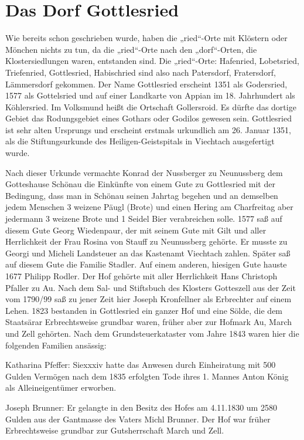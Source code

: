\documentclass[12pt,a4pager]{book}
\begin{document}
\section{Das Dorf Gottlesried}

Wie bereits schon geschrieben wurde, haben die „ried“-Orte mit Klöstern oder
Mönchen nichts zu tun, da die „ried“-Orte nach den „dorf“-Orten, die
Klostersiedlungen waren, entstanden sind. Die „ried“-Orte: Hafenried,
Lobetsried, Triefenried, Gottlesried, Habischried sind also nach Patersdorf,
Fratersdorf, Lämmersdorf gekommen. Der Name Gottlesried erscheint 1351 als
Godersried, 1577 als Gottelsried und auf einer Landkarte von Appian im 18.
Jahrhundert als Köhlersried. Im Volksmund heißt die Ortschaft Gollersroid. Es
dürfte das dortige Gebiet das Rodungsgebiet eines Gothars oder Godilos gewesen
sein. Gottlesried ist sehr alten Ursprungs und erscheint erstmals urkundlich am
26. Januar 1351, als die Stiftungsurkunde des Heiligen-Geistspitals in Viechtach
ausgefertigt wurde.

Nach dieser Urkunde vermachte Konrad der Nussberger zu Neunussberg dem
Gotteshause Schönau die Einkünfte von einem Gute zu Gottlesried mit der
Bedingung, dass man in Schönau seinen Jahrtag begehen und an demselben jedem
Menschen 3 weizene Päugl (Brote) und einen Hering am Charfreitag aber jedermann
3 weizene Brote und 1 Seidel Bier verabreichen solle. 1577 saß auf diesem Gute
Georg Wiedenpaur, der mit seinem Gute mit Gilt und aller Herrlichkeit der Frau
Rosina von Stauff zu Neunussberg gehörte. Er musste zu Georgi und Micheli
Landsteuer an das Kastenamt Viechtach zahlen. Später saß auf diesem Gute die
Familie Stadler. Auf einem anderen, hiesigen Gute hauste 1677 Philipp Rodler.
Der Hof gehörte mit aller Herrlichkeit Hans Christoph Pfaller zu Au. Nach dem
Sal- und Stiftsbuch des Klosters Gotteszell aus der Zeit vom 1790/99 saß zu
jener Zeit hier Joseph Kronfellner als Erbrechter auf einem Lehen. 1823
bestanden in Gottlesried ein ganzer Hof und eine Sölde, die dem Staatsärar
Erbrechtsweise grundbar waren, früher aber zur Hofmark Au, March und Zell
gehörten. Nach dem Grundsteuerkataster vom Jahre 1843 waren hier die folgenden
Familien ansässig:

Katharina Pfeffer: Siexxxiv hatte das Anwesen durch Einheiratung mit 500 Gulden
Vermögen nach dem 1835 erfolgten Tode ihres 1. Mannes Anton König als
Alleineigentümer erworben.

Joseph Brunner: Er gelangte in den Besitz des Hofes am 4.11.1830 um 2580 Gulden
aus der Gantmasse des Vaters Michl Brunner. Der Hof war früher Erbrechtsweise
grundbar zur Gutsherrschaft March und Zell.
\end{document}
